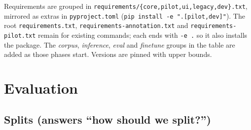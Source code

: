 \documentclass[11pt]{article}
\begin{document}
Requirements are grouped in \texttt{requirements/\allowbreak{}\{core,\allowbreak{}pilot,\allowbreak{}ui,\allowbreak{}legacy,\allowbreak{}dev\}.\allowbreak{}txt}, mirrored as extras in \texttt{pyproject.toml} (\texttt{pip install -e ".[pilot,dev]"}). The root \texttt{requirements.txt}, \texttt{requirements-annotation.txt} and \texttt{requirements-pilot.txt} remain for existing commands; each ends with \texttt{-e .} so it also installs the package. The \emph{corpus}, \emph{inference}, \emph{eval} and \emph{finetune} groups in the table are added as those phases start. Versions are pinned with upper bounds.

\hypertarget{evaluation}{%
\section{Evaluation}\label{evaluation}}

\hypertarget{splits-answers-how-should-we-split}{%
\subsection{Splits (answers ``how should we split?'')}\label{splits-answers-how-should-we-split}}
\end{document}
